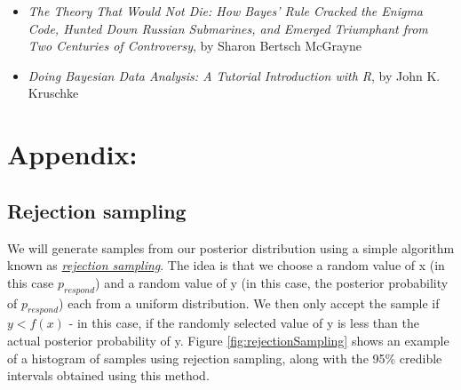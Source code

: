 \documentclass[
  12pt,
]{book}
\providecommand{\tightlist}{%
  \setlength{\itemsep}{0pt}\setlength{\parskip}{0pt}}
\theoremstyle{definition}
\theoremstyle{definition}
\theoremstyle{definition}
\theoremstyle{remark}
\begin{document}
\begin{itemize}
\tightlist
\item
  \emph{The Theory That Would Not Die: How Bayes' Rule Cracked the Enigma Code, Hunted Down Russian Submarines, and Emerged Triumphant from Two Centuries of Controversy}, by Sharon Bertsch McGrayne
\item
  \emph{Doing Bayesian Data Analysis: A Tutorial Introduction with R}, by John K. Kruschke
\end{itemize}

\hypertarget{appendix}{%
\section{Appendix:}\label{appendix}}

\hypertarget{rejection-sampling}{%
\subsection{Rejection sampling}\label{rejection-sampling}}

We will generate samples from our posterior distribution using a simple algorithm known as \href{https://am207.github.io/2017/wiki/rejectionsampling.html}{\emph{rejection sampling}}. The idea is that we choose a random value of x (in this case \(p_{respond}\)) and a random value of y (in this case, the posterior probability of \(p_{respond}\)) each from a uniform distribution. We then only accept the sample if \(y < f(x)\) - in this case, if the randomly selected value of y is less than the actual posterior probability of y. Figure \ref{fig:rejectionSampling} shows an example of a histogram of samples using rejection sampling, along with the 95\% credible intervals obtained using this method.
\end{document}

